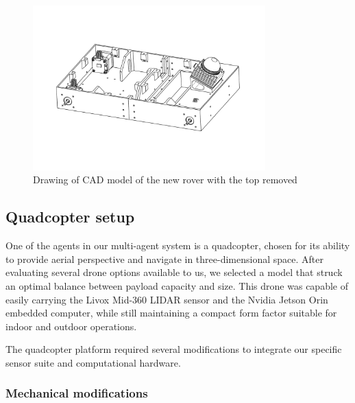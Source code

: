 \documentclass[11pt]{article}
\begin{document}
        \begin{figure}[H]
            \centering
            \includegraphics[width=0.8\textwidth]{Images/roverv2.pdf}
            \caption{Drawing of CAD model of the new rover with the top removed}
            \label{fig:crawlerv2_cad}
        \end{figure}


    \subsection{Quadcopter setup}
            

            One of the agents in our multi-agent system is a quadcopter, chosen for its ability to provide aerial perspective and navigate in three-dimensional space. After evaluating several drone options available to us, we selected a model that struck an optimal balance between payload capacity and size. This drone was capable of easily carrying the Livox Mid-360 LIDAR sensor and the Nvidia Jetson Orin embedded computer, while still maintaining a compact form factor suitable for indoor and outdoor operations.

            The quadcopter platform required several modifications to integrate our specific sensor suite and computational hardware.

            \subsubsection{Mechanical modifications}
\end{document}
